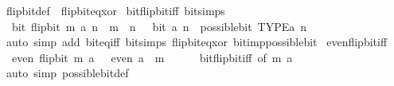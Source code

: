 \begin{isabellebody}
\endisatagproof
{\isafoldproof}%
%
\isadelimproof
\isanewline
%
\endisadelimproof
\isanewline
{}\isamarkupfalse%
\ flip{\isacharunderscore}{\kern0pt}bit{\isacharunderscore}{\kern0pt}def\ {\isacharequal}{\kern0pt}\ flip{\isacharunderscore}{\kern0pt}bit{\isacharunderscore}{\kern0pt}eq{\isacharunderscore}{\kern0pt}xor\isanewline
\isanewline
{}\isamarkupfalse%
\ bit{\isacharunderscore}{\kern0pt}flip{\isacharunderscore}{\kern0pt}bit{\isacharunderscore}{\kern0pt}iff\ {\isacharbrackleft}{\kern0pt}bit{\isacharunderscore}{\kern0pt}simps{\isacharbrackright}{\kern0pt}{\isacharcolon}{\kern0pt}\isanewline
\ \ {\isacartoucheopen}bit\ {\isacharparenleft}{\kern0pt}flip{\isacharunderscore}{\kern0pt}bit\ m\ a{\isacharparenright}{\kern0pt}\ n\ {\isasymlongleftrightarrow}\ {\isacharparenleft}{\kern0pt}m\ {\isacharequal}{\kern0pt}\ n\ {\isasymlongleftrightarrow}\ {\isasymnot}\ bit\ a\ n{\isacharparenright}{\kern0pt}\ {\isasymand}\ possible{\isacharunderscore}{\kern0pt}bit\ TYPE{\isacharparenleft}{\kern0pt}{\isacharprime}{\kern0pt}a{\isacharparenright}{\kern0pt}\ n{\isacartoucheclose}\isanewline
%
\isadelimproof
\ \ %
\endisadelimproof
%
\isatagproof
{}\isamarkupfalse%
\ {\isacharparenleft}{\kern0pt}auto\ simp\ add{\isacharcolon}{\kern0pt}\ bit{\isacharunderscore}{\kern0pt}eq{\isacharunderscore}{\kern0pt}iff\ bit{\isacharunderscore}{\kern0pt}simps\ flip{\isacharunderscore}{\kern0pt}bit{\isacharunderscore}{\kern0pt}eq{\isacharunderscore}{\kern0pt}xor\ bit{\isacharunderscore}{\kern0pt}imp{\isacharunderscore}{\kern0pt}possible{\isacharunderscore}{\kern0pt}bit{\isacharparenright}{\kern0pt}%
\endisatagproof
{\isafoldproof}%
%
\isadelimproof
\isanewline
%
\endisadelimproof
\isanewline
{}\isamarkupfalse%
\ even{\isacharunderscore}{\kern0pt}flip{\isacharunderscore}{\kern0pt}bit{\isacharunderscore}{\kern0pt}iff{\isacharcolon}{\kern0pt}\isanewline
\ \ {\isacartoucheopen}even\ {\isacharparenleft}{\kern0pt}flip{\isacharunderscore}{\kern0pt}bit\ m\ a{\isacharparenright}{\kern0pt}\ {\isasymlongleftrightarrow}\ {\isasymnot}\ {\isacharparenleft}{\kern0pt}even\ a\ {\isasymlongleftrightarrow}\ m\ {\isacharequal}{\kern0pt}\ {}{\isacharparenright}{\kern0pt}{\isacartoucheclose}\isanewline
%
\isadelimproof
\ \ %
\endisadelimproof
%
\isatagproof
{}\isamarkupfalse%
\ bit{\isacharunderscore}{\kern0pt}flip{\isacharunderscore}{\kern0pt}bit{\isacharunderscore}{\kern0pt}iff\ {\isacharbrackleft}{\kern0pt}of\ m\ a\ {}{\isacharbrackright}{\kern0pt}\ \isamarkupfalse%
\ {\isacharparenleft}{\kern0pt}auto\ simp{\isacharcolon}{\kern0pt}\ possible{\isacharunderscore}{\kern0pt}bit{\isacharunderscore}{\kern0pt}def{\isacharparenright}{\kern0pt}%

\end{isabellebody}
